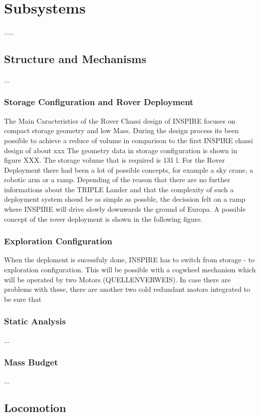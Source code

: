 \chapter{Subsystems}
\label{chap:subsystems}
.....

\section{Structure and Mechanisms}
\label{sec:mechanics}
...
\subsection{Storage Configuration and Rover Deployment}
The Main Caracteristics of the Rover Chassi design of INSPIRE focuses on compact storage geometry and low Mass. 
During the design process its been possible to achieve a reduce of volume in comparison to the first INSPIRE chassi design of about xxx%
The geometry data in storage configuration is shown in figure XXX.
The storage volume that is required is 131 l.
For the Rover Deployment there had been a lot of possible concepts, for example a sky crane, a robotic arm or a ramp. Depending of the reason that there are no further informations about the TRIPLE Lander and that the complexity of such a deployment system shoud be as simple as possble, the decission felt on a ramp where INSPIRE will drive slowly downwards the ground of Europa. 
A possible concept of the rover deployment is shown in the following figure.
\subsection{Exploration Configuration}
When the deploment is sucessfuly done, INSPIRE has to switch from storage - to exploration configuration.
This will be possible with a cogwheel mechanism which will be operated by two Motors (QUELLENVERWEIS). In case there are problems with these, there are another two cold redundant motors integrated to be sure that

\subsection{Static Analysis}
...
\subsection{Mass Budget}
...

\section{Locomotion} \label{sec:locomotion}

